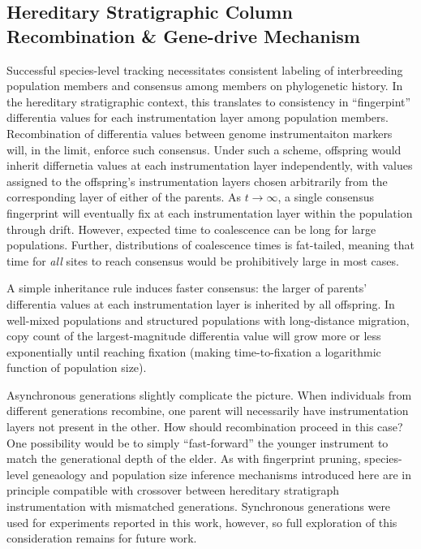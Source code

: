 \subsection{Hereditary Stratigraphic Column Recombination \& Gene-drive Mechanism}
\label{sec:gene-drive}



Successful species-level tracking necessitates consistent labeling of interbreeding population members and consensus among members on phylogenetic history.
In the hereditary stratigraphic context, this translates to consistency in ``fingerpint'' differentia values for each instrumentation layer among population members.
Recombination of differentia values between genome instrumentaiton markers will, in the limit, enforce such consensus.
Under such a scheme, offspring would inherit differnetia values at each instrumentation layer independently, with values assigned to the offspring's instrumentation layers chosen arbitrarily from the corresponding layer of either of the parents.
As $t \to \infty$, a single consensus fingerprint will eventually fix at each instrumentation layer within the population through drift.
However, expected time to coalescence can be long for large populations.
Further, distributions of coalescence times is fat-tailed, meaning that time for \textit{all} sites to reach consensus would be prohibitively large in most cases.

A simple inheritance rule induces faster consensus: the larger of parents' differentia values at each instrumentation layer is inherited by all offspring.
In well-mixed populations and structured populations with long-distance migration, copy count of the largest-magnitude differentia value will grow more or less exponentially until reaching fixation (making time-to-fixation a logarithmic function of population size).

Asynchronous generations slightly complicate the picture.
When individuals from different generations recombine, one parent will necessarily have instrumentation layers not present in the other.
How should recombination proceed in this case?
One possibility would be to simply ``fast-forward'' the younger instrument to match the generational depth of the elder.
As with fingerprint pruning, species-level geneaology and population size inference mechanisms introduced here are in principle compatible with crossover between hereditary stratigraph instrumentation with mismatched generations.
Synchronous generations were used for experiments reported in this work, however, so full exploration of this consideration remains for future work.

